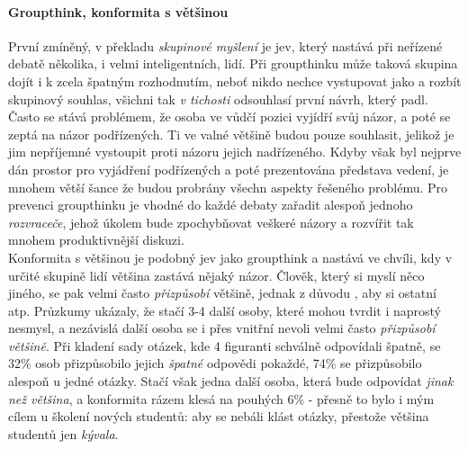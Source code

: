 \paragraph{Groupthink, konformita s většinou}
První zmíněný, v překladu \emph{skupinové myšlení} je jev, který nastává při neřízené debatě několika, i velmi inteligentních, lidí. Při groupthinku může taková skupina dojít i k zcela špatným rozhodnutím, neboť nikdo nechce vystupovat jako  a rozbít skupinový souhlas, všichni tak \emph{v tichosti} odsouhlasí první návrh, který padl. Často se stává problémem, že osoba ve vůdčí pozici vyjídří svůj názor, a poté se zeptá na názor podřízených. Ti ve valné většině budou pouze souhlasit, jelikož je jim nepříjemné vystoupit proti názoru jejich nadřízeného. Kdyby však byl nejprve dán prostor pro vyjádření podřízených a poté prezentována představa vedení, je mnohem větší šance že budou probrány všechn aspekty řešeného problému. Pro prevenci groupthinku je vhodné do každé debaty zařadit alespoň jednoho \emph{rozvraceče}, jehož úkolem bude zpochybňovat veškeré názory a rozvířit tak mnohem produktivnější diskuzi.\\
Konformita s většinou je podobný jev jako groupthink a nastává ve chvíli, kdy v určité skupině lidí většina zastává nějaký názor. Člověk, který si myslí něco jiného, se pak velmi často \emph{přizpůsobí} většině, jednak z důvodu , aby si ostatní  atp. Průzkumy \cite{prochazka} ukázaly, že stačí 3-4 další osoby, které mohou tvrdit i naprostý nesmysl, a nezávislá další osoba se i přes vnitřní nevoli velmi často \emph{přizpůsobí většině}. Při kladení sady otázek, kde 4 figuranti schválně odpovídali špatně, se 32\% osob přizpůsobilo jejich \emph{špatné} odpovědi pokaždé, 74\% se přizpůsobilo alespoň u jedné otázky. Stačí však jedna další osoba, která bude odpovídat \emph{jinak než většina}, a konformita rázem klesá na pouhých 6\% - přesně to bylo i mým cílem u školení nových studentů: aby se nebáli klást otázky, přestože většina studentů jen \emph{kývala}.

